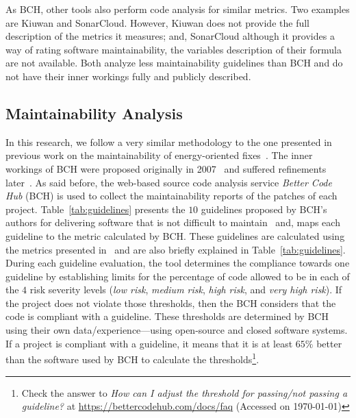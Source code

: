 \documentclass[smallextended]{svjour3}       %
\begin{document}
As BCH, other tools also perform code analysis for similar 
metrics. Two examples are Kiuwan and SonarCloud. However, Kiuwan does
not provide the full description of the metrics it measures; and, SonarCloud
although it provides a way of rating software maintainability, the variables 
description of their formula are not available. Both analyze less maintainability
guidelines than BCH and do not have their inner workings fully and publicly described.

\subsection{Maintainability Analysis}\label{sec:main_analysis}


In this research, we follow a very similar methodology to the one 
presented in previous work on the maintainability of energy-oriented 
fixes~\cite{8919169}. The inner workings of BCH were proposed
originally in 2007~\cite{4335232} and suffered refinements later~\cite{5609747,6113040,baggen2012}. 
As said before, the web-based source code 
analysis service \emph{Better Code Hub} (BCH) is used to collect the 
maintainability reports of the patches of each project. 
Table~\ref{tab:guidelines} presents the $10$ guidelines proposed
by BCH's authors for delivering software that is not difficult to
maintain~\cite{Visser:2016:OREILLY} and, maps each guideline to the 
metric calculated by BCH. These guidelines are calculated using the 
metrics presented in~\cite{criteria:2017} and are also briefly explained in Table~\ref{tab:guidelines}. 
During each guideline evaluation, the tool determines the compliance 
towards one guideline by establishing limits for the percentage of 
code allowed to be in each of the $4$ risk severity levels
(\emph{low risk}, \emph{medium risk}, \emph{high risk}, and 
\emph{very high risk}). If the project does not violate those 
thresholds, then the BCH considers that the code is compliant with 
a guideline. These thresholds are determined by BCH using their own
data/experience---using open-source and closed software systems. If 
a project is compliant with a guideline, it means that it is at 
least $65\%$ better than the software used by BCH to calculate the 
thresholds\footnote{Check the answer to \emph{How can I adjust the 
threshold for passing/not passing a guideline?} at
\url{https://bettercodehub.com/docs/faq} (Accessed on \today{})}.
\end{document}
